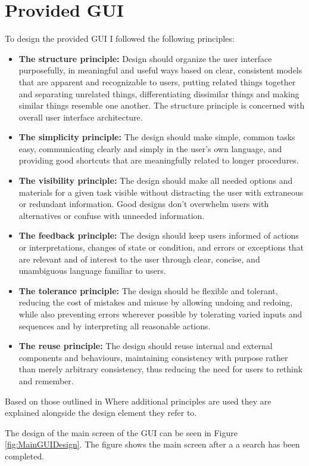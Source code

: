 \section{Provided GUI}
\label{sec:provgui}
To design the provided GUI I followed the following principles:
\begin{itemize}
 \item \textbf{The structure principle:} Design should organize the user interface purposefully, in meaningful and useful ways based on clear, consistent models that are apparent and recognizable to users, putting related things together and separating unrelated things, differentiating dissimilar things and making similar things resemble one another. 
The structure principle is concerned with overall user interface architecture.
\item \textbf{The simplicity principle:} The design should make simple, common tasks easy, communicating clearly and simply in the user's own language, and providing good shortcuts that are meaningfully related to longer procedures.
\item \textbf{The visibility principle:} The design should make all needed options and materials for a given task visible without distracting the user with extraneous or redundant information. 
Good designs don't overwhelm users with alternatives or confuse with unneeded information.
\item \textbf{The feedback principle:} The design should keep users informed of actions or interpretations, changes of state or condition, and errors or exceptions that are relevant and of interest to the user through clear, concise, and unambiguous language familiar to users.
\item \textbf{The tolerance principle:} The design should be flexible and tolerant, reducing the cost of mistakes and misuse by allowing undoing and redoing, while also preventing errors wherever possible by tolerating varied inputs and sequences and by interpreting all reasonable actions.
\item \textbf{The reuse principle:} The design should reuse internal and external components and behaviours, maintaining consistency with purpose rather than merely arbitrary consistency, thus reducing the need for users to rethink and remember.
\end{itemize}
Based on those outlined in \cite{constantine1999software}
Where additional principles are used they are explained alongside the design element they refer to.

The design of the main screen of the GUI can be seen in Figure \ref{fig:MainGUIDesign}.
The figure shows the main screen after a a search has been completed.

